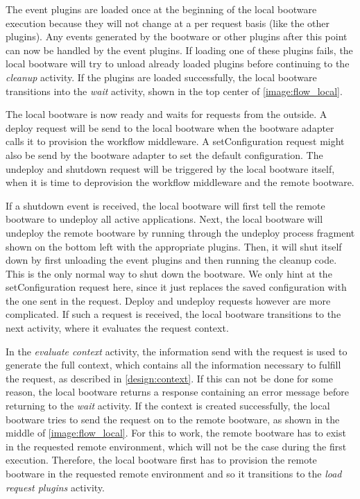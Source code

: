 The event plugins are loaded once at the beginning of the local bootware execution because they will not change at a per request basis (like the other plugins).
Any events generated by the bootware or other plugins after this point can now be handled by the event plugins.
If loading one of these plugins fails, the local bootware will try to unload already loaded plugins before continuing to the \textit{cleanup} activity.
If the plugins are loaded successfully, the local bootware transitions into the \textit{wait} activity, shown in the top center of \autoref{image:flow_local}.

The local bootware is now ready and waits for requests from the outside.
A deploy request will be send to the local bootware when the bootware adapter calls it to provision the workflow middleware.
A setConfiguration request might also be send by the bootware adapter to set the default configuration.
The undeploy and shutdown request will be triggered by the local bootware itself, when it is time to deprovision the workflow middleware and the remote bootware.

If a shutdown event is received, the local bootware will first tell the remote bootware to undeploy all active applications.
Next, the local bootware will undeploy the remote bootware by running through the undeploy process fragment shown on the bottom left with the appropriate plugins.
Then, it will shut itself down by first unloading the event plugins and then running the cleanup code.
This is the only normal way to shut down the bootware.
We only hint at the setConfiguration request here, since it just replaces the saved configuration with the one sent in the request.
Deploy and undeploy requests however are more complicated.
If such a request is received, the local bootware transitions to the next activity, where it evaluates the request context.

In the \textit{evaluate context} activity, the information send with the request is used to generate the full context, which contains all the information necessary to fulfill the request, as described in \autoref{design:context}.
If this can not be done for some reason, the local bootware returns a response containing an error message before returning to the \textit{wait} activity.
If the context is created successfully, the local bootware tries to send the request on to the remote bootware, as shown in the middle of \autoref{image:flow_local}.
For this to work, the remote bootware has to exist in the requested remote environment, which will not be the case during the first execution.
Therefore, the local bootware first has to provision the remote bootware in the requested remote environment and so it transitions to the \textit{load request plugins} activity.


